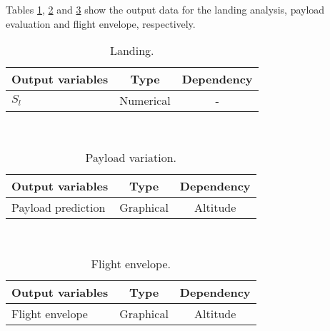 \documentclass[10pt]{SelfArx} %
\begin{document}
Tables \ref{Tab:output_landing}, \ref{Tab:output_payload} and \ref{Tab:output_envelope} show the output data for the landing analysis, payload evaluation and flight envelope, respectively.

\begin{table}[htb]
\small\sf\centering
\caption{Landing.\label{Tab:output_landing}}
\begin{tabular}{lcc}
\toprule
Output variables 		&Type 		&Dependency 	\\
\midrule
{$S_{l}$}			&Numerical		&- 			\\
\bottomrule
\end{tabular}\\[16pt]
\end{table}

\begin{table}[htb]
\small\sf\centering
\caption{Payload variation.\label{Tab:output_payload}}
\begin{tabular}{lcc}
\toprule
Output variables		&Type			&Dependency 	\\
\midrule
{Payload prediction}	&Graphical		&Altitude 		\\
\bottomrule
\end{tabular}\\[16pt]
\end{table}

\begin{table}[htb]
\small\sf\centering
\caption{Flight envelope.\label{Tab:output_envelope}}
\begin{tabular}{lcc}
\toprule
Output variables 		&Type			&Dependency	\\
\midrule
{Flight envelope}		&Graphical		&Altitude		\\
\bottomrule
\end{tabular}\\[16pt]
\end{table}
\vfill


\end{document}
